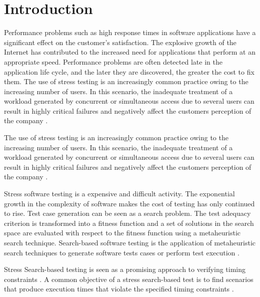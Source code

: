 
\vspace*{-.15in}
\section{Introduction}
\vspace*{-.05in}

Performance problems such as high response times in software applications have a significant effect on the customer’s satisfaction. The explosive growth of the Internet has contributed to the increased need for applications that perform at an appropriate speed. Performance problems are often detected late in the application life cycle, and the later they are discovered, the greater the cost to fix them. The use of stress testing is an increasingly common practice owing to the increasing number of users. In this scenario, the inadequate treatment of a workload generated by concurrent or simultaneous access due to several users can result in highly critical failures and negatively affect the customers perception of the company \cite{Draheim2006b} \cite{Jiang2010} \cite{Molyneaux2009} \cite{Wert2014}. 

The use of stress testing is an increasingly common practice owing to the increasing number of users. In this scenario, the inadequate treatment of a workload generated by concurrent or simultaneous access due to several users can result in highly critical failures and negatively affect the customers perception of the company \cite{Draheim2006b} \cite{Jiang2010}. 

Stress software testing is a expensive and difficult activity. The exponential
growth in the complexity of software makes the cost of testing has only continued to rise. Test case generation can be seen as a search problem. The test adequacy criterion is transformed into a fitness function and a set of solutions in the search
space are evaluated with respect to the fitness function using a metaheuristic search technique. Search-based software testing is the application of metaheuristic search techniques to generate software
tests cases or perform test execution \cite{Afzal2009a} \cite{Gay}.


Stress Search-based testing is seen as a promising approach to verifying timing constraints \cite{Afzal2009a}. A common objective of a stress search-based test is to find  scenarios that produce execution times that violate the specified timing constraints \cite{Sullivan}. 

